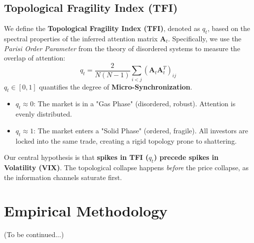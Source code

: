 \documentclass[review]{elsarticle}
\begin{document}
\subsection{Topological Fragility Index (TFI)}

We define the \textbf{Topological Fragility Index (TFI)}, denoted as $q_t$, based on the spectral properties of the inferred attention matrix $\mathbf{A}_t$. Specifically, we use the \textit{Parisi Order Parameter} from the theory of disordered systems to measure the overlap of attention:
\begin{equation}
    q_t = \frac{2}{N(N-1)} \sum_{i < j} (\mathbf{A}_t \mathbf{A}_t^T)_{ij}
\end{equation}
$q_t \in [0, 1]$ quantifies the degree of \textbf{Micro-Synchronization}.
\begin{itemize}
    \item $q_t \approx 0$: The market is in a "Gas Phase" (disordered, robust). Attention is evenly distributed.
    \item $q_t \approx 1$: The market enters a "Solid Phase" (ordered, fragile). All investors are locked into the same trade, creating a rigid topology prone to shattering.
\end{itemize}

Our central hypothesis is that \textbf{spikes in TFI ($q_t$) precede spikes in Volatility (VIX)}. The topological collapse happens \textit{before} the price collapse, as the information channels saturate first.

\section{Empirical Methodology}
(To be continued...)


\end{document}
